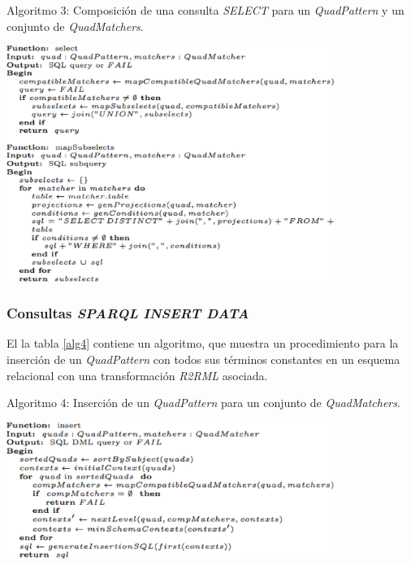 \begin{table}
\vspace{2.4in}
\caption{Algoritmo 3: Composici\'on de una consulta \textit{SELECT} para un \textit{QuadPattern} y un conjunto de \textit{QuadMatchers}.}
\vspace{5mm}
\includegraphics[width=0.8\textwidth]{algoritmo3}
\label{alg3}
\end{table}


\subsubsection{Consultas \textit{SPARQL} \textit{INSERT DATA}}

El la tabla \ref{alg4} contiene un algoritmo, que  muestra un procedimiento para la inserci\'on de un \textit{QuadPattern} con todos sus t\'erminos constantes en un esquema relacional con una transformaci\'on \textit{R2RML} asociada.\\

\begin{table}
\vspace{2.4in}
\caption{Algoritmo 4: Inserci\'on de un \textit{QuadPattern} para un conjunto de \textit{QuadMatchers}.}
\vspace{5mm}
\includegraphics[width=0.8\textwidth]{algoritmo4}
\label{alg4}
\end{table}


